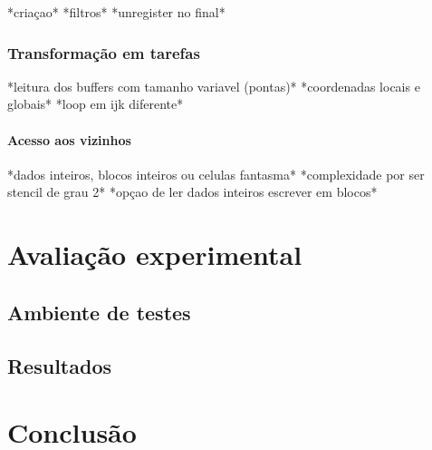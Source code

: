 \documentclass[cic,tc]{iiufrgs}
\begin{document}
*criaçao*
*filtros*
*unregister no final*

\subsection{Transformação em tarefas}
*leitura dos buffers com tamanho variavel (pontas)*
*coordenadas locais e globais*
*loop em ijk diferente*

\subsubsection{Acesso aos vizinhos}
*dados inteiros, blocos inteiros ou celulas fantasma*
*complexidade por ser stencil de grau 2*
*opçao de ler dados inteiros escrever em blocos*

\chapter{Avaliação experimental}
\section{Ambiente de testes}
\section{Resultados}

\chapter{Conclusão}

% 

% 



\end{document}
